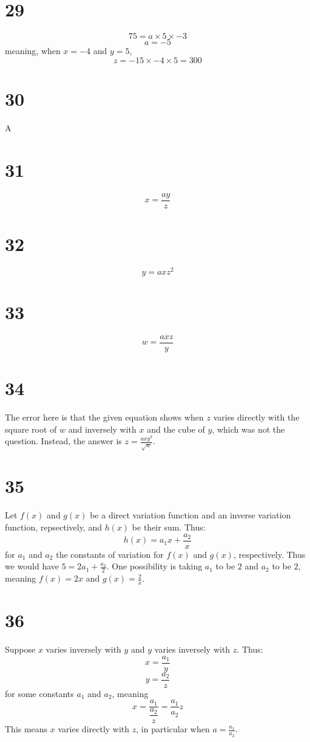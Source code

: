 \documentclass{article}
\theoremstyle{definition}
\newcommand{\?}{\stackrel{?}{=}}
\begin{document}
\section*{29}
\[ 75=a\times 5\times -3 \] \[ a=-5 \] meaning, when $x=-4$ and $y=5$, \[ z=-15\times -4\times 5=300 \]

\section*{30}
A

\section*{31}
\[ x=\frac{ay}{z} \]

\section*{32}
\[ y=axz^2 \]

\section*{33}
\[ w=\frac{axz}{y} \]

\section*{34}
The error here is that the given equation shows when $z$ varies directly with the square root of $w$ and inversely with $x$ and the cube of $y$, which was not the question. Instead, 
the answer is $z=\frac{axy^3}{\sqrt{w}}$.

\section*{35}
Let $f(x)$ and $g(x)$ be a direct variation function and an inverse variation function, repsectively, and $h(x)$ be their sum. Thus:
\[ h(x)=a_1x+\frac{a_2}{x} \] for $a_1$ and $a_2$ the constants of variation for $f(x)$ and $g(x)$, respectively. Thus we would have 
$5=2a_1+\frac{a_2}{2}$. One possibility is taking $a_1$ to be $2$ and $a_2$ to be $2$, meaning $f(x)=2x$ and $g(x)=\frac{2}{x}$.

\section*{36}
Suppose $x$ varies inversely with $y$ and $y$ varies inversely with $z$. Thus:
\[ x=\frac{a_1}{y} \] \[ y=\frac{a_2}{z} \] for some constants $a_1$ and $a_2$, meaning \[ x=\frac{a_1}{\dfrac{a_2}{z}}=\frac{a_1}{a_2}z \] This means $x$ varies directly with $z$, 
in particular when $a=\frac{a_1}{a_2}$.
\end{document}
